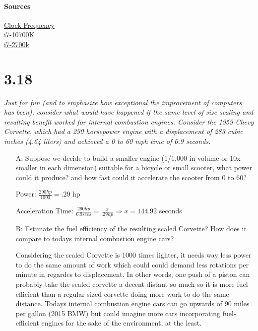 \documentclass[10pt]{article}
\begin{document}
\paragraph{Sources} 
\href{http://cpudb.stanford.edu/visualize/clock_frequency}{Clock Frequency} \\
\href{https://ark.intel.com/content/www/us/en/ark/products/199316/intel-core-i7-10700-processor-16m-cache-up-to-4-80-ghz.html}{i7-10700K} \\
\href{https://ark.intel.com/content/www/us/en/ark/products/61275/intel-core-i7-2700k-processor-8m-cache-up-to-3-90-ghz.htmls}{i7-2700k}


\section{3.18}
\textit{Just for fun (and to emphasize how exceptional the improvement of computers has
been), consider what would have happened if the same level of size scaling and resulting
benefit worked for internal combustion engines. Consider the 1959 Chevy Corvette, which
had a 290 horsepower engine with a displacement of 283 cubic inches (4.64 liters) and
achieved a 0 to 60 mph time of 6.9 seconds.}

\begin{itemize}

    \item[A:] Suppose we decide to build a smaller engine (1/1,000 in volume or 10x smaller in each
dimension) suitable for a bicycle or small scooter, what power could it produce? and
how fast could it accelerate the scooter from 0 to 60?
    \item[] Power: $\frac{290hp}{1000} = .29$ hp
    \item[] Acceleration Time: $\frac{290hp}{6.9 secs} = \frac{x}{.29 hp} \Rightarrow x = 144.92$ seconds
    
    \item[B:] Estimate the fuel efficiency of the resulting scaled Corvette? How does it compare to
todays internal combustion engine cars?
    \item[] Considering the scaled Corvette is 1000 times lighter, it needs way less power to do the same amount of work which could 
    could demand less rotations per minute in regardes to displacement. In other words, one push of a piston can probably
    take the scaled corvette a decent distant so much so it is more fuel efficient than a regular sized corvette doing more work to do the same distance. 
    Todays internal combustion engine cars can go upwards of 90 miles per gallon (2015 BMW) but could imagine more cars incorporating
    fuel-efficient engines for the sake of the environment, at the least.   

\end{itemize}
\end{document}
